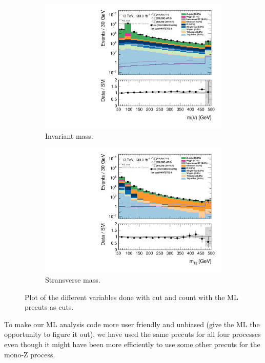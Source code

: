 \begin{figure}[H]
\begin{subfigure}[t!]{0.49\textwidth}
        \includegraphics[width=\textwidth]{Figures/SlepSlep/CutAndCount/ML_cuts/hist1d_mll_ML_cuts.pdf}
    \caption{Invariant mass.}
    \label{fig:my_label}
    \end{subfigure}
    \begin{subfigure}[t!]{0.49\textwidth}
        \includegraphics[width=\textwidth]{Figures/SlepSlep/CutAndCount/ML_cuts/hist1d_mt2_ML_cuts.pdf}
    \caption{Stransverse mass.}
    \label{fig:my_label}
    \end{subfigure}
        \caption{Plot of the different variables done with cut and count with the ML precuts as cuts.}
    \label{fig:ML_cuts}
\end{figure}

\restoregeometry

To make our ML analysis code more user friendly and unbiased (give the ML the opportunity to figure it out), we have used the same precuts for all four processes even though it might have been more efficiently to use some other precuts for the mono-Z process.

